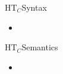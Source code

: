 \begin{frame}{HT$_C$}{Syntax}
  \begin{itemize}
  \item
  \end{itemize}
\end{frame}
\begin{frame}{HT$_C$}{Semantics}
  \begin{itemize}
  \item
  \end{itemize}
\end{frame}
